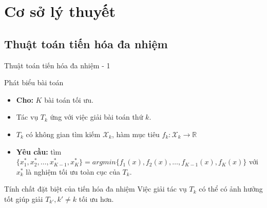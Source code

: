 \section{Cơ sở lý thuyết}

\subsection{Thuật toán tiến hóa đa nhiệm}

\begin{frame}{Thuật toán tiến hóa đa nhiệm - 1}
    \begin{alertblock}{Phát biểu bài toán}
        \begin{itemize}
            \item \textbf{Cho:} $K$ bài toán tối ưu.
            \item Tác vụ $T_k$ ứng với việc giải bài toán thứ $k$.
            \item $T_k$ có không gian tìm kiếm $\mathcal{X}_k$, hàm mục tiêu $f_k:\mathcal{X}_k \rightarrow \mathbb{R}$
            \item \textbf{Yêu cầu:} tìm $\{x^*_1, x^*_2, \ldots, x^*_{K-1}, x^*_K\}=argmin\{f_1(x), f_2(x), \ldots, f_{K-1}(x), f_K(x)\}$ với $x^*_k$ là nghiệm tối ưu toàn cục của $T_k$.
        \end{itemize}
    \end{alertblock}
    \begin{block}{Tính chất đặt biệt của tiến hóa đa nhiệm}
        Việc giải tác vụ $T_k$ có thể có ảnh hưởng tốt giúp giải $T_{k'}, k' \ne k$ tối ưu hơn.
    \end{block}
\end{frame}

